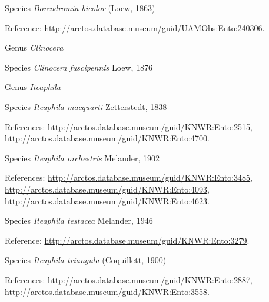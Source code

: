 \documentclass[9pt, article]{memoir}
\begin{document}
\begin{multicols}{2}
\vspace{6pt}\noindent\hspace{36pt}Species \textit{Boreodromia bicolor} (Loew, 1863)


\vspace{6pt}Reference: 
\url{http://arctos.database.museum/guid/UAMObs:Ento:240306}.

\vspace{6pt}\noindent\hspace{30pt}Genus \textit{Clinocera}


\vspace{6pt}\noindent\hspace{36pt}Species \textit{Clinocera fuscipennis} Loew, 1876


\vspace{6pt}\noindent\hspace{30pt}Genus \textit{Iteaphila}


\vspace{6pt}\noindent\hspace{36pt}Species \textit{Iteaphila macquarti} Zetterstedt, 1838


\vspace{6pt}References: 
\url{http://arctos.database.museum/guid/KNWR:Ento:2515}, 
\url{http://arctos.database.museum/guid/KNWR:Ento:4700}.

\vspace{6pt}\noindent\hspace{36pt}Species \textit{Iteaphila orchestris} Melander, 1902


\vspace{6pt}References: 
\url{http://arctos.database.museum/guid/KNWR:Ento:3485}, 
\url{http://arctos.database.museum/guid/KNWR:Ento:4093}, 
\url{http://arctos.database.museum/guid/KNWR:Ento:4623}.

\vspace{6pt}\noindent\hspace{36pt}Species \textit{Iteaphila testacea} Melander, 1946


\vspace{6pt}Reference: 
\url{http://arctos.database.museum/guid/KNWR:Ento:3279}.

\vspace{6pt}\noindent\hspace{36pt}Species \textit{Iteaphila triangula} (Coquillett, 1900)


\vspace{6pt}References: 
\url{http://arctos.database.museum/guid/KNWR:Ento:2887}, 
\url{http://arctos.database.museum/guid/KNWR:Ento:3558}.


\end{multicols}
\end{document}
